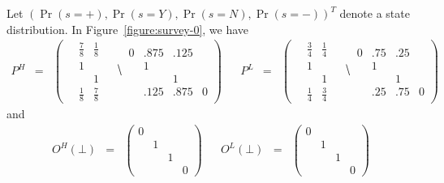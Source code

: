 Let $(\Pr (s = +), \Pr (s = Y), \Pr (s = N), \Pr (s = -))^T$ denote a
state distribution. In Figure~\ref{figure:survey-0}, we have
\[
  \begin{array}{rclcrcl}
    P^H & = &
      \left(
         \begin{array}{cccc}
           \  & \frac{7}{8} & \frac{1}{8} & \ \\
              &           1 &             &  \\
              &             &           1 &  \\
              & \frac{1}{8} & \frac{7}{8} &  
         \end{array}
\hide{              
         \begin{array}{cccc}
           0  & .875 & .125 & \ \\
              &    1 &      &  \\
              &      &    1 &  \\
              & .125 & .875 & 0 
         \end{array}
}
      \right)
    & 
    &
    P^L & = &
      \left(
         \begin{array}{cccc}
           \  & \frac{3}{4} & \frac{1}{4} & \ \\
              &           1 &             &   \\
              &             &           1 &   \\
              & \frac{1}{4} & \frac{3}{4} &   
         \end{array}
\hide{
         \begin{array}{cccc}
           0  & .75 & .25 & \ \\
              &   1 &     &   \\
              &     &   1 &   \\
              & .25 & .75 & 0
         \end{array}
}
      \right)
  \end{array}
\]
and
\[
  \begin{array}{rclcrcl}
    O^H (\bot) & = &
      \left(
         \begin{array}{cccc}
           0 & \ & \ & \  \\
             & 1 &   &    \\
             &   & 1 &    \\
             &   &   &  0 
         \end{array}
      \right)
    &&
    O^L (\bot) & = &
      \left(
         \begin{array}{cccc}
           0 & \ & \ & \  \\
             & 1 &   &    \\
             &   & 1 &    \\
             &   &   &  0 
         \end{array}
      \right)
  \end{array}
\]
